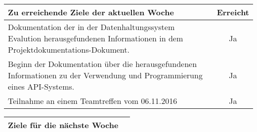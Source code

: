 \begin{tabularx}{\textwidth}{Xc}
    \arrayrulecolor{OliveGreen}
    \toprule
    {\bfseries Zu erreichende Ziele der aktuellen Woche} & {\bfseries Erreicht} \\
    \midrule[2pt]
    Dokumentation der in der Datenhaltungssystem Evalution
    herausgefundenen Informationen in dem 
    Projektdokumentations-Dokument.  &  Ja  \\
    \rowcolor{OliveGreen!15}
    Beginn der Dokumentation über die herausgefundenen Informationen
    zu der Verwendung und Programmierung eines API-Systems.  &  Ja \\
    \rowcolor{White}
    Teilnahme an einem Teamtreffen vom 06.11.2016  &  Ja \\
    \bottomrule[2pt]
\end{tabularx}
%
\vspace{1cm}
%
\begin{tabularx}{\textwidth}{Xc}
    \arrayrulecolor{OliveGreen}
    \toprule
    {\bfseries Ziele für die nächste Woche}              &                      \\
    \midrule[2pt]
\end{tabularx}
